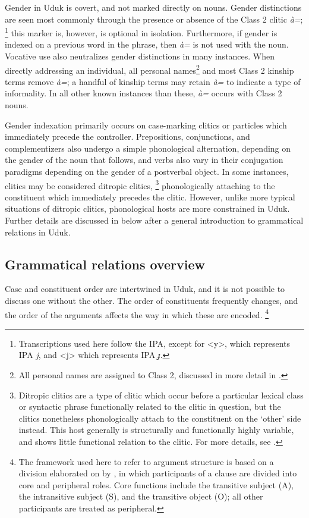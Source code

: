 \documentclass[output=collectionpaper,hidelinks]{langscibook}
\theoremstyle{remark}
\begin{document}
Gender in Uduk is covert, and not marked directly on nouns. Gender distinctions
are seen most commonly through the presence or absence of the Class 2 clitic
\emph{à=};%
\footnote{Transcriptions used here follow the IPA, except for <y>, which
represents IPA \emph{j}, and <j> which represents IPA \emph{ɟ}.} %
this marker is, however, is optional in isolation.  Furthermore, if gender is
indexed on a previous word in the phrase, then \emph{à=} is not used with the
noun.  Vocative use also neutralizes gender distinctions in many instances.
When directly addressing an individual, all personal names\footnote{All personal
names are assigned to Class 2, discussed in more detail in
.} and most Class 2 kinship terms remove \emph{à=}; a
handful of kinship terms may retain \emph{à=} to indicate a type of
informality.  In all other known instances than these, \emph{à=} occurs with
Class 2 nouns.

Gender indexation primarily occurs on case-marking clitics or particles which
immediately precede the controller.  Prepositions, conjunctions, and
complementizers also undergo a simple phonological alternation, depending on the
gender of the noun that follows, and verbs also vary in their conjugation
paradigms depending on the gender of a postverbal object.  In some instances,
clitics may be considered ditropic clitics,%
\footnote{Ditropic clitics are a type of clitic which occur before a particular
lexical class or syntactic phrase functionally related to the clitic in
question, but the clitics nonetheless phonologically attach to the constituent
on the `other' side instead.  This host generally is structurally and
functionally highly variable, and shows little functional relation to the
clitic.  For more details, see \citet{Cysouw_Enclitics_2005}.} %
phonologically attaching to the constituent which immediately precedes the
clitic.  However, unlike more typical situations of ditropic clitics,
phonological hosts are more constrained in Uduk.  Further details are discussed
in  below after a general introduction to
grammatical relations in Uduk.


\subsection{Grammatical relations overview}
\label{sec:Don:Grammatical_relations_overview}

Case and constituent order are intertwined in Uduk, and it is not possible to
discuss one without the other. The order of constituents frequently changes,
and the order of the arguments affects the way in which these are
encoded.%
\footnote{The framework used here to refer to argument structure is based
on a division elaborated on by \citet{Dixon_1994}, in which participants of a
clause are divided into core and peripheral roles. Core functions include the
transitive subject (A), the intransitive subject (S), and the transitive object
(O); all other participants are treated as peripheral.}
\end{document}
